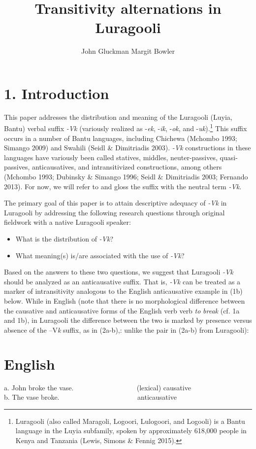 \documentclass[output=paper]{langsci/langscibook}
\title{Transitivity alternations in Luragooli}
\author{%
 John Gluckman\affiliation{UCLA}\lastand 
 Margit Bowler \affiliation{}
}
\begin{document}
 
 

\chapter{1. Introduction}

This paper addresses the distribution and meaning of the Luragooli (Luyia, Bantu) verbal suffix \textit{{}-Vk} (variously realized as -\textit{ek}, -\textit{ik}, -\textit{ok}, and -\textit{uk}).\footnote{ Luragooli (also called Maragoli, Logoori, Lulogoori, and Logooli) is a Bantu language in the Luyia subfamily, spoken by approximately 618,000 people in Kenya and Tanzania (Lewis, Simons \& Fennig 2015).} This suffix occurs in a number of Bantu languages, including Chichewa (Mchombo 1993; Simango 2009) and Swahili (Seidl \& Dimitriadis 2003). \textit{{}-Vk} constructions in these languages have variously been called statives, middles, neuter-passives, quasi-passives, anticausatives, and intransitivized constructions, among others (Mchombo 1993; Dubinsky \& Simango 1996; Seidl \& Dimitriadis 2003; Fernando 2013). For now, we will refer to and gloss the suffix with the neutral term \textit{{}-Vk}.

The primary goal of this paper is to attain descriptive adequacy of \textit{{}-Vk} in Luragooli by addressing the following research questions through original fieldwork with a native Luragooli speaker:

\begin{itemize}
\item What is the distribution of \textit{{}-Vk}?

\item What meaning(s) is/are associated with the use of \textit{{}-Vk}?

\end{itemize}

Based on the answers to these two questions, we suggest that Luragooli \textit{{}-Vk }should be analyzed as an anticausative suffix. That is, \textit{{}-Vk} can be treated as a marker of intransitivity analogous to the English anticausative example in (1b) below. While in English (note that there is no morphological difference between the causative and anticausative forms of the English verb verb \textit{to }\textit{break}\textit{ }(cf. 1a and 1b), in Luragooli the difference between the two is marked by presence versus absence of the –V\textit{k }suffix, as in (2a-b),: unlike the pair in (2a-b) from Luragooli):

\chapter[  English]{  English}
\gll a.  John broke the vase.~~~ ~~~ ~~~ ~~~ ~~~       (lexical) causative \\
\gll b.  The vase broke. ~~~ ~~~ ~~~ ~~~ ~~~ ~~~       anticausative \\
\end{document}
